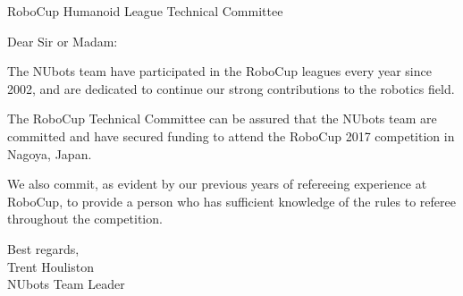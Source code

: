 \documentclass{letter}
\begin{document}
\begin{letter}{RoboCup Humanoid League Technical Committee}
\opening{Dear Sir or Madam:}
The NUbots team have participated in the RoboCup leagues every year since 2002, and are dedicated to continue our strong contributions to the robotics field.

The RoboCup Technical Committee can be assured that the NUbots team are committed and have secured funding to attend the RoboCup 2017 competition in Nagoya, Japan.

We also commit, as evident by our previous years of refereeing experience at RoboCup, to provide a person who has sufficient knowledge of the rules to referee throughout the competition.

Best regards, \\ Trent Houliston \\ NUbots Team Leader

\end{letter}
\end{document}

